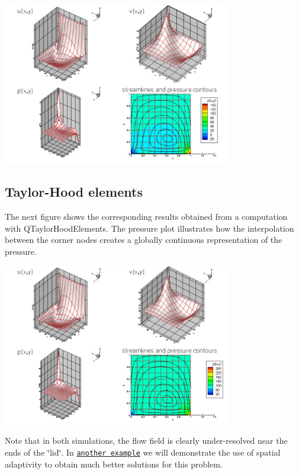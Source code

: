  
\begin{DoxyImage}
\includegraphics[width=0.75\textwidth]{CrouzeixRaviart}
\end{DoxyImage}
\hypertarget{index_results_TH}{}\subsection{Taylor-\/\+Hood elements}\label{index_results_TH}
The next figure shows the corresponding results obtained from a computation with {\ttfamily Q\+Taylor\+Hood\+Elements}. The pressure plot illustrates how the interpolation between the corner nodes creates a globally continuous representation of the pressure.

 
\begin{DoxyImage}
\includegraphics[width=0.75\textwidth]{TaylorHood}
\end{DoxyImage}


Note that in both simulations, the flow field is clearly under-\/resolved near the ends of the \char`\"{}lid\char`\"{}. In \href{../../adaptive_driven_cavity/html/index.html}{\tt another example} we will demonstrate the use of spatial adaptivity to obtain much better solutions for this problem.



